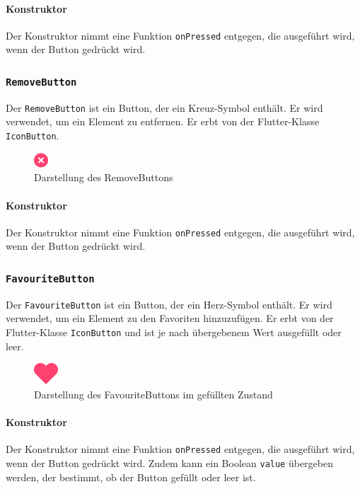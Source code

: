 \documentclass{entwurfsheft}
\begin{document}
\paragraph*{Konstruktor}
Der Konstruktor nimmt eine Funktion \texttt{onPressed} entgegen, die ausgeführt wird, wenn der Button gedrückt wird.

\subsubsection{\texttt{RemoveButton}}
\label{sec:removeButton}
Der \texttt{RemoveButton} ist ein Button, der ein Kreuz-Symbol enthält. Er wird verwendet, um ein Element zu entfernen. Er erbt von der Flutter-Klasse \texttt{IconButton}.
\begin{figure}[htp]
    \centering
    \includegraphics[height = .5cm]{images/presentationLayer/uiElements/removeButton.png}
    \caption{Darstellung des RemoveButtons}
\end{figure}
\paragraph*{Konstruktor}
Der Konstruktor nimmt eine Funktion \texttt{onPressed} entgegen, die ausgeführt wird, wenn der Button gedrückt wird.

\subsubsection{\texttt{FavouriteButton}}
\label{sec:favouriteButton}
Der \texttt{FavouriteButton} ist ein Button, der ein Herz-Symbol enthält. Er wird verwendet, um ein Element zu den Favoriten hinzuzufügen. Er erbt von der Flutter-Klasse \texttt{IconButton} und ist je nach übergebenem Wert ausgefüllt oder leer.
\begin{figure}[htp]
    \centering
    \includegraphics[height = .5cm]{images/presentationLayer/uiElements/favouriteButton.png}
    \caption{Darstellung des FavouriteButtons im gefüllten Zustand}
\end{figure}
\paragraph*{Konstruktor}
Der Konstruktor nimmt eine Funktion \texttt{onPressed} entgegen, die ausgeführt wird, wenn der Button gedrückt wird. Zudem kann ein Boolean \texttt{value} übergeben werden, der bestimmt, ob der Button gefüllt oder leer ist.
\end{document}
